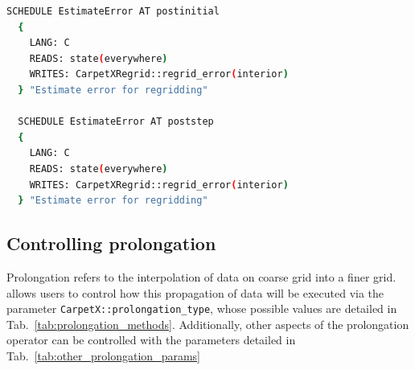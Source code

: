 \begin{lstlisting}[language=bash]
  SCHEDULE EstimateError AT postinitial
  {
    LANG: C
    READS: state(everywhere)
    WRITES: CarpetXRegrid::regrid_error(interior)
  } "Estimate error for regridding"
  
  SCHEDULE EstimateError AT poststep
  {
    LANG: C
    READS: state(everywhere)
    WRITES: CarpetXRegrid::regrid_error(interior)
  } "Estimate error for regridding"
\end{lstlisting}

\subsection{Controlling prolongation}

Prolongation refers to the interpolation of data on coarse grid into a finer grid. \CarpetX\space allows users to control how this propagation of data will be executed via the parameter \texttt{CarpetX::prolongation\_type}, whose possible values are detailed in Tab.~\ref{tab:prolongation_methods}. Additionally, other aspects of the prolongation operator can be controlled with the parameters detailed in Tab.~\ref{tab:other_prolongation_params}

